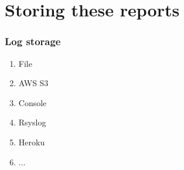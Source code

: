\documentclass[13pt, ignorenonframetext]{beamer}
\begin{document}
\section{Storing these reports}
\begin{frame}[fragile]
\frametitle{Log storage}
\begin{enumerate}
\item File
\item AWS S3
\item Console
\item Rsyslog
\item Heroku
\item ...
\end{enumerate}
\end{frame}
\end{document}
